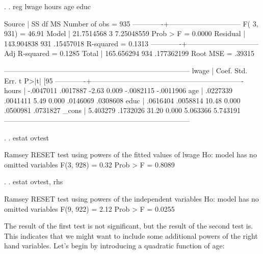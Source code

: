 \documentclass[12pt]{article}
\begin{document}
\begin{stlog}
  . 
. reg lwage hours age educ

      Source |       SS       df       MS              Number of obs =     935
-------------+------------------------------           F(  3,   931) =   46.91
       Model |  21.7514568     3  7.25048559           Prob > F      =  0.0000
    Residual |  143.904838   931   .15457018           R-squared     =  0.1313
-------------+------------------------------           Adj R-squared =  0.1285
       Total |  165.656294   934  .177362199           Root MSE      =  .39315

------------------------------------------------------------------------------
       lwage |      Coef.   Std. Err.      t    P>|t|     [95%
-------------+----------------------------------------------------------------
       hours |  -.0047011   .0017887    -2.63   0.009    -.0082115   -.0011906
         age |   .0227339   .0041411     5.49   0.000     .0146069    .0308608
        educ |   .0616404   .0058814    10.48   0.000     .0500981    .0731827
       _cons |   5.403279   .1732026    31.20   0.000     5.063366    5.743191
------------------------------------------------------------------------------

. 
. estat ovtest

Ramsey RESET test using powers of the fitted values of lwage
       Ho:  model has no omitted variables
                 F(3, 928) =      0.32
                  Prob > F =      0.8089

. 
. estat ovtest, rhs

Ramsey RESET test using powers of the independent variables
       Ho:  model has no omitted variables
                 F(9, 922) =      2.12
                  Prob > F =      0.0255
\end{stlog}

The result of the first test is not significant, but the result of the
second test is. This indicates that we might want to include some
additional powers of the right hand variables. Let's begin by
introducing a quadratic function of age:
\end{document}
